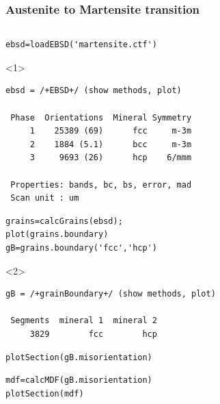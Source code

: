 \documentclass[compress]{beamer}
\begin{document}
\begin{frame}[fragile]
  \frametitle{Austenite to Martensite transition}

  \vspace{-0.6cm}
  \begin{overlayarea}{\textwidth}{0.61\textheight}
    \begin{columns}
      \begin{column}{0.6\textwidth}
        \begin{lstlisting}[style=input]
ebsd=loadEBSD('martensite.ctf')
        \end{lstlisting}
        \begin{onlyenv}<1>
          \vspace{-0.3cm}
          \begin{lstlisting}[style=output]
ebsd = /+EBSD+/ (show methods, plot)

 Phase  Orientations  Mineral Symmetry
     1    25389 (69)      fcc     m-3m
     2    1884 (5.1)      bcc     m-3m
     3     9693 (26)      hcp    6/mmm

 Properties: bands, bc, bs, error, mad
 Scan unit : um
          \end{lstlisting}
        \end{onlyenv}

        \pause

        \vspace{-0.3cm}
        \begin{lstlisting}[style=input]
grains=calcGrains(ebsd);
plot(grains.boundary)
gB=grains.boundary('fcc','hcp')
        \end{lstlisting}
        \begin{onlyenv}<2>
          \vspace{-0.3cm}
          \begin{lstlisting}[style=output]
gB = /+grainBoundary+/ (show methods, plot)

 Segments  mineral 1  mineral 2
     3829        fcc        hcp
          \end{lstlisting}
        \end{onlyenv}

      \pause
      \vspace{-0.3cm}
      \begin{lstlisting}[style=input]
plotSection(gB.misorientation)
      \end{lstlisting}

      \pause
      \vspace{-0.3cm}
      \begin{lstlisting}[style=input]
mdf=calcMDF(gB.misorientation)
plotSection(mdf)
      \end{lstlisting}


\end{column}
\end{columns}
\end{overlayarea}
\end{frame}
\end{document}
